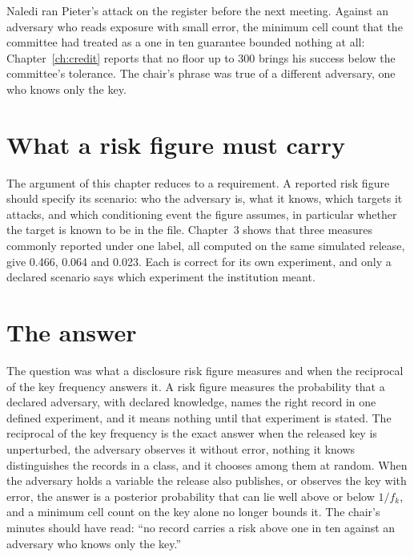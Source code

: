 Naledi ran Pieter's attack on the register before the next meeting. Against an adversary who
reads exposure with small error, the minimum cell count that the committee had treated as a
one in ten guarantee bounded nothing at all: Chapter~\ref{ch:credit} reports that no floor up
to 300 brings his success below the committee's tolerance. The chair's phrase was true of a
different adversary, one who knows only the key.

\section{What a risk figure must carry}

The argument of this chapter reduces to a requirement. A reported risk figure
should specify its scenario: who the adversary is, what it knows, which targets it
attacks, and which conditioning event the figure assumes, in particular whether the
target is known to be in the file. Chapter~3 shows that three measures commonly
reported under one label, all computed on the same simulated release, give 0.466,
0.064 and 0.023. Each is correct for its own experiment, and only a declared
scenario says which experiment the institution meant.

\section{The answer}

The question was what a disclosure risk figure measures and when the reciprocal of the key
frequency answers it. A risk figure measures the probability that a declared adversary, with
declared knowledge, names the right record in one defined experiment, and it means nothing
until that experiment is stated. The reciprocal of the key frequency is the exact answer when
the released key is unperturbed, the adversary observes it without error, nothing it knows
distinguishes the records in a class, and it chooses among them at random. When the adversary
holds a variable the release also publishes, or observes the key with error, the answer is a
posterior probability that can lie well above or below $1/f_k$, and a minimum cell count on
the key alone no longer bounds it. The chair's minutes should have read: ``no record carries a
risk above one in ten against an adversary who knows only the key.''


